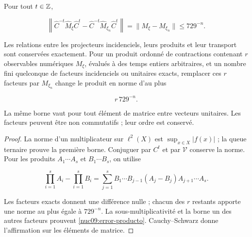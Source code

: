 \begin{theorem}
\label{nuc09:precision}
Pour tout \(t\in\mathbb Z\),



\begin{equation}
\boxed{
\left\|\widehat C^{-t}\widehat M_\xi\widehat C^t
-\widehat C^{-t}\widehat M_{\xi_n}\widehat C^t\right\|
=\|M_\xi-M_{\xi_n}\|\le729^{-n}.}
\label{nuc09:error-observable}
\end{equation}



Les relations entre les projecteurs incidenciels, leurs produits
et leur transport sont conservées exactement.
Pour un produit ordonné de contractions contenant \(r\)
observables numériques \(M_\xi\), évalués à des temps entiers
arbitraires, et un nombre fini quelconque de facteurs incidenciels
ou unitaires exacts, remplacer ces \(r\) facteurs par
\(M_{\xi_n}\) change le produit en norme d’au plus



\begin{equation}
\boxed{r\,729^{-n}.}
\label{nuc09:error-producto}
\end{equation}



La même borne vaut pour tout élément de matrice entre vecteurs
unitaires. Les facteurs peuvent être non commutatifs ; leur ordre est conservé.

\end{theorem}

\begin{proof}
La norme d’un multiplicateur sur \(\ell^2(X)\) est
\(\sup_{x\in X}|f(x)|\) ; la queue ternaire prouve la première borne.
Conjuguer par \(C^t\) et par \(\mathcal V\) conserve la norme.
Pour les produits \(A_1\cdots A_s\) et \(B_1\cdots B_s\), on utilise



\[
\prod_{i=1}^s A_i-\prod_{i=1}^s B_i
=\sum_{j=1}^s B_1\cdots B_{j-1}(A_j-B_j)A_{j+1}\cdots A_s.
\]



Les facteurs exacts donnent une différence nulle ; chacun des \(r\)
restants apporte une norme au plus égale à \(729^{-n}\).
La sous-multiplicativité et la borne un des autres facteurs prouvent
\eqref{nuc09:error-producto}.
Cauchy--Schwarz donne l’affirmation sur les éléments de matrice.

\end{proof}

